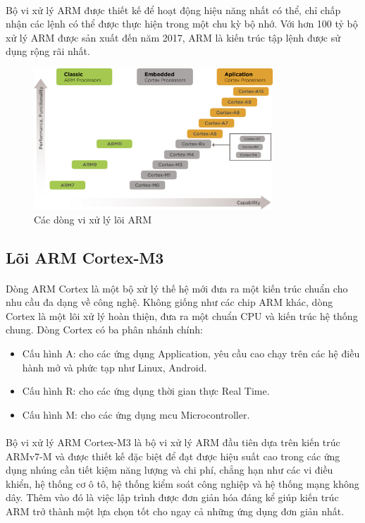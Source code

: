 \paragraph{}
Bộ vi xử lý ARM được thiết kế để hoạt động hiệu năng nhất có thể, chỉ chấp nhận các lệnh có thể được thực hiện trong một chu kỳ bộ nhớ. Với hơn 100 tỷ bộ xử lý ARM được sản xuất đến năm 2017, ARM là kiến trúc tập lệnh được sử dụng rộng rãi nhất.
\begin{figure}[H]
    \centering
    \includegraphics[width=0.8\textwidth]{images/all-arm.jpg}
    \caption{Các dòng vi xử lý lõi ARM}
    \label{fig:all-arm-core}
\end{figure}
\subsection{Lõi ARM Cortex-M3}
\paragraph{}
Dòng ARM Cortex là một bộ xử lý thế hệ mới đưa ra một kiến trúc chuẩn cho nhu cầu đa dạng về công nghệ. Không giống như các chip ARM khác, dòng Cortex là một lõi xử lý hoàn thiện, đưa ra một chuẩn CPU và kiến trúc hệ thống chung. Dòng Cortex có ba phân nhánh chính:
\begin{itemize}
    \item Cấu hình A: cho các ứng dụng Application, yêu cầu cao chạy trên các hệ điều hành mở và phức tạp như Linux, Android.
    \item Cấu hình R: cho các ứng dụng thời gian thực Real Time.
    \item Cấu hình M: cho các ứng dụng \acrfull{mcu} Microcontroller.
\end{itemize}
\paragraph{}
Bộ vi xử lý ARM Cortex-M3 là bộ vi xử lý ARM đầu tiên dựa trên kiến trúc ARMv7-M và được thiết kế đặc biệt để đạt được hiệu suất cao trong các ứng dụng nhúng cần tiết kiệm năng lượng và chi phí, chẳng hạn như các vi điều khiển, hệ thống cơ ô tô, hệ thống kiểm soát công nghiệp và hệ thống mạng không dây. Thêm vào đó là việc lập trình được đơn giản hóa đáng kể giúp kiến trúc ARM trở thành một lựa chọn tốt cho ngay cả những ứng dụng đơn giản nhất.
